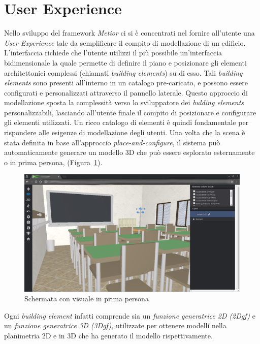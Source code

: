 \section{User Experience}
\label{sec:chapter_2_section_1}

Nello sviluppo del framework \emph{Metior} ci si è concentrati nel fornire all'utente una \emph{User Experience} tale
da semplificare il compito di modellazione di un edificio.
L'interfaccia richiede che l'utente utilizzi il più possibile un'interfaccia bidimensionale la quale permette
di definire il piano e posizionare gli elementi architettonici complessi (chiamati \emph{building elements}) su di esso.
Tali \emph{building elements} sono presenti all'interno in un catalogo pre-caricato, e possono essere
configurati e personalizzati attraverso il pannello laterale. Questo approccio
di modellazione sposta la complessità verso lo sviluppatore dei \emph{bulding elements} personalizzabili,
lasciando all'utente finale il compito di posizionare e configurare gli elementi utilizzati.
Un ricco catalogo di elementi \`e quindi fondamentale per rispondere alle esigenze di modellazione degli utenti.
Una volta che la scena \`e stata definita in base all'approccio \emph{place-and-configure}, il sistema può automaticamente
generare un modello 3D che pu\`o essere esplorato esternamente o in prima persona,
(Figura~\ref{fig:3D-school}).\\

\begin{figure}[htbp] %
   \centering
   \includegraphics[width=1\linewidth]{images/3d-school}
   \caption{Schermata con visuale in prima persona}
   \label{fig:3D-school}
\end{figure}
\newpage

Ogni \emph{building element} infatti comprende sia un \emph{funzione generatrice 2D (2Dgf)} e un
\emph{funzione generatrice 3D (3Dgf)}, utilizzate per ottenere modelli nella planimetria 2D e in 3D che ha generato il modello
rispettivamente.
